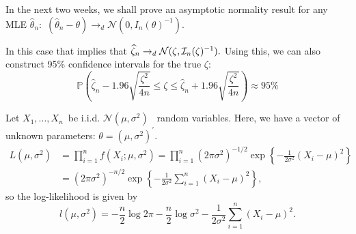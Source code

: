 \documentclass[notes=show]{beamer}
\begin{document}
\begin{frame}%

\begin{example}[Rayleigh]
In the next two weeks, we shall prove an asymptotic normality result for any
MLE $\widehat{\theta }_{n}:$ $(\widehat{\theta }_{n}-\theta )\rightarrow _{d}%
\mathcal{N}(0,I_{n}(\theta )^{-1}).$

In this case that implies that $\widehat{\zeta }_{n}\rightarrow _{d}\mathcal{%
N}(\zeta ,\mathcal{I}_{n}(\zeta )^{-1}).$ Using this, we can also construct
95\% confidence intervals for the true $\zeta :$%
\begin{equation*}
\mathbb{P}\left( \widehat{\zeta }_{n}-1.96\sqrt{\frac{\zeta ^{2}}{4n}}\leq
\zeta \leq \widehat{\zeta }_{n}+1.96\sqrt{\frac{\zeta ^{2}}{4n}}\right)
\approx 95\%
\end{equation*}
\end{example}

\end{frame}%

\begin{frame}%


Let $X_{1},...,X_{n}$\ be i.i.d. $\mathcal{N}\left( \mu ,\sigma ^{2}\right) $%
\ random variables. Here, we have a vector of unknown parameters: $\theta
=\left( \mu ,\sigma ^{2}\right) ^{\prime }$.%
\begin{align*}
L\left( \mu ,\sigma ^{2}\right) & =\prod\limits_{i=1}^{n}f\left( X_{i};\mu
,\sigma ^{2}\right) =\prod\limits_{i=1}^{n}\left( 2\pi \sigma ^{2}\right)
^{-1/2}\exp \left\{ -\frac{1}{2\sigma ^{2}}\left( X_{i}-\mu \right)
^{2}\right\}  \\
& =\left( 2\pi \sigma ^{2}\right) ^{-n/2}\exp \left\{ -\frac{1}{2\sigma ^{2}}%
\sum_{i=1}^{n}\left( X_{i}-\mu \right) ^{2}\right\} ,
\end{align*}%
so the log-likelihood is given by%
\begin{equation*}
l\left( \mu ,\sigma ^{2}\right) =-\frac{n}{2}\log 2\pi -\frac{n}{2}\log
\sigma ^{2}-\frac{1}{2\sigma ^{2}}\sum_{i=1}^{n}\left( X_{i}-\mu \right)
^{2}.
\end{equation*}

\end{frame}%
\end{document}
